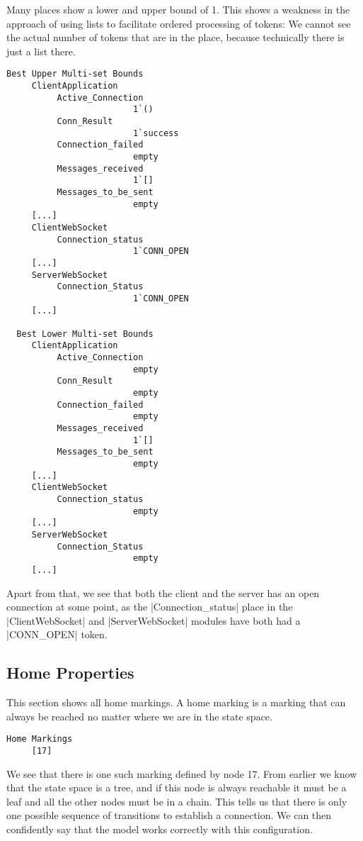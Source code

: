	Many places show a lower and upper bound of 1. This shows a weakness
	in the approach of using lists to facilitate ordered processing of tokens: We
	cannot see the actual number of tokens that are in the place, because
	technically there is just a list there. 
	
	\begin{lstlisting}[language={}]
  Best Upper Multi-set Bounds
     ClientApplication
          Active_Connection
                         1`()
          Conn_Result
                         1`success
          Connection_failed
                         empty
          Messages_received
                         1`[]
          Messages_to_be_sent
                         empty
     [...]
     ClientWebSocket
          Connection_status
                         1`CONN_OPEN
     [...]
     ServerWebSocket
          Connection_Status
                         1`CONN_OPEN
     [...]

  Best Lower Multi-set Bounds
     ClientApplication
          Active_Connection
                         empty
          Conn_Result
                         empty
          Connection_failed
                         empty
          Messages_received
                         1`[]
          Messages_to_be_sent
                         empty
     [...]
     ClientWebSocket
          Connection_status
                         empty
     [...]
     ServerWebSocket
          Connection_Status
                         empty
     [...]
	\end{lstlisting}
	
	Apart from that, we see that both the client and the server has an open
	connection at some point, as the |Connection_status| place in the
	|ClientWebSocket| and |ServerWebSocket| modules have both had a |CONN_OPEN|
	token.
	
	\subsection{Home Properties}
	This section shows all home markings. A home marking is a marking that can
	always be reached no matter where we are in the state space. 
	\begin{lstlisting}[language={}]
  Home Markings
     [17]
	\end{lstlisting}
	We see that there is one such marking defined by node 17. From earlier we know
	that the state space is a tree, and if this node is always reachable it must be a leaf
	and all the other nodes must be in a chain. This tells us that there is only
	one possible sequence of transitions to establish a connection. We can then
	confidently say that the model works correctly with this configuration.
	
